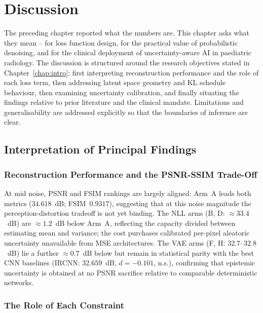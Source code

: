 \documentclass[12pt, a4paper, twoside, openright]{book}
\begin{document}
\chapter{Discussion}
\label{chap:discussion}

The preceding chapter reported what the numbers are. This chapter asks what they mean -- for loss function design, for the practical value of probabilistic denoising, and for the clinical deployment of uncertainty-aware AI in paediatric radiology. The discussion is structured around the research objectives stated in Chapter~\ref{chap:intro}: first interpreting reconstruction performance and the role of each loss term, then addressing latent space geometry and KL schedule behaviour, then examining uncertainty calibration, and finally situating the findings relative to prior literature and the clinical mandate. Limitations and generalisability are addressed explicitly so that the boundaries of inference are clear.

\section{Interpretation of Principal Findings}
\label{sec:disc:findings}

\subsection{Reconstruction Performance and the PSNR-SSIM Trade-Off}
\label{sec:disc:findings:psnr}

At mid noise, PSNR and FSIM rankings are largely aligned: Arm~A leads both metrics ($34.618$~dB; FSIM~$0.9317$), suggesting that at this noise magnitude the perception-distortion tradeoff \cite{blau_perception_2018} is not yet binding. The NLL arms (B, D: $\approx 33.4$~dB) are $\approx 1.2$~dB below Arm~A, reflecting the capacity divided between estimating mean and variance; the cost purchases calibrated per-pixel aleatoric uncertainty unavailable from MSE architectures. The VAE arms (F, H: $32.7$--$32.8$~dB) lie a further $\approx 0.7$~dB below but remain in statistical parity with the best CNN baselines (IRCNN: $32.659$~dB, $d=-0.101$, n.s.), confirming that epistemic uncertainty is obtained at no PSNR sacrifice relative to comparable deterministic networks.

\subsection{The Role of Each Constraint}
\label{sec:disc:findings:constraints}
\end{document}

